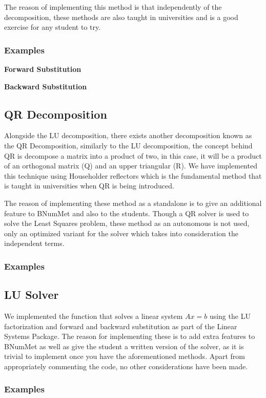 The reason of implementing this method is that independently of the decomposition, these methods are also taught in universities and is a good exercise for any student to try.
\subsubsection{Examples}
\textbf{Forward Substitution}
	
 \textbf{Backward Substitution}
	
\subsection{QR Decomposition}
Alongside the LU decomposition, there exists another decomposition known as the QR Decomposition, similarly to the LU decomposition, the concept behind QR is decompose a matrix into a product of two, in this case, it will be a product of an orthogonal matrix (Q) and an upper triangular (R). We have implemented this technique using Householder reflectors which is the fundamental method that is taught in universities when QR is being introduced.

The reason of implementing these method as a standalone is to give an additional feature to BNumMet and also to the students. Though a QR solver is used to solve the Least Squares problem, these method as an autonomous is not used, only an optimized variant for the solver which takes into consideration the independent terms.
\subsubsection{Examples}


\subsection{LU Solver}
We implemented the function that solves a linear system $Ax=b$ using the LU factorization and forward and backward substitution as part of the Linear Systems Package. The reason for implementing these is to add extra features to BNumMet as well as give the student a written version of the solver, as it is trivial to implement once you have the aforementioned methods. Apart from appropriately commenting the code, no other considerations have been made.
\subsubsection{Examples}
	

